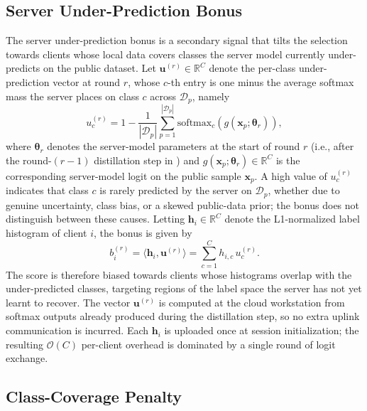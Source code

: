\documentclass[journal]{IEEEtran}
\newcommand{\revIVE}[1]{#1}
\begin{document}
\subsection{Server Under-Prediction Bonus}
\label{ssec:bonus-term}

\revIVE{The server under-prediction bonus is a secondary signal that tilts the selection towards clients whose local data covers classes the server model currently under-predicts on the public dataset.} Let $\bm{u}^{(r)} \in \mathbb{R}^{C}$ denote the per-class under-prediction vector at round $r$, whose $c$-th entry is one minus the average softmax mass the server places on class $c$ across $\mathcal{D}_p$, namely
\begin{equation}
u_c^{(r)} = 1 - \frac{1}{|\mathcal{D}_p|}\sum_{p=1}^{|\mathcal{D}_p|} \mathrm{softmax}_c\!\left(g(\bm{x}_p; \bm{\theta}_r)\right),
\label{eq:uncert}
\end{equation}
where $\bm{\theta}_r$ denotes the server-model parameters at the start of round $r$ (i.e., after the round-$(r{-}1)$ distillation step in \cite[Algorithm~1]{mu2024fedtskd}) and $g(\bm{x}_p; \bm{\theta}_r) \in \mathbb{R}^{C}$ is the corresponding server-model logit on the public sample $\bm{x}_p$. \revIVE{A high value of $u_c^{(r)}$ indicates that class $c$ is rarely predicted by the server on $\mathcal{D}_p$, whether due to genuine uncertainty, class bias, or a skewed public-data prior; the bonus does not distinguish between these causes.} Letting $\bm{h}_i \in \mathbb{R}^{C}$ denote the L1-normalized label histogram of client $i$, the bonus is given by
\begin{equation}
b_i^{(r)} = \langle \bm{h}_i, \bm{u}^{(r)} \rangle = \sum_{c=1}^{C} h_{i,c}\, u_c^{(r)}.
\label{eq:bonus}
\end{equation}
\revIVE{The score is therefore biased towards clients whose histograms overlap with the under-predicted classes, targeting regions of the label space the server has not yet learnt to recover. The vector $\bm{u}^{(r)}$ is computed at the cloud workstation from softmax outputs already produced during the distillation step, so no extra uplink communication is incurred. Each $\bm{h}_i$ is uploaded once at session initialization; the resulting $\mathcal{O}(C)$ per-client overhead is dominated by a single round of logit exchange.}

\subsection{Class-Coverage Penalty}
\label{ssec:penalty-term}
\end{document}
